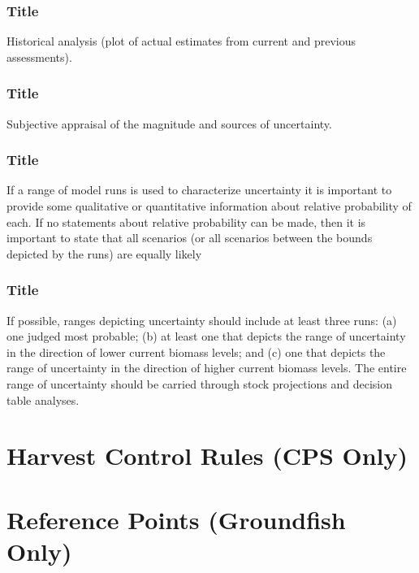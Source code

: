 \documentclass[12pt,]{article}
\begin{document}
\subsubsection{Title}\label{title-37}

Historical analysis (plot of actual estimates from current and previous
assessments).

\subsubsection{Title}\label{title-38}

Subjective appraisal of the magnitude and sources of uncertainty.

\subsubsection{Title}\label{title-39}

If a range of model runs is used to characterize uncertainty it is
important to provide some qualitative or quantitative information about
relative probability of each. If no statements about relative
probability can be made, then it is important to state that all
scenarios (or all scenarios between the bounds depicted by the runs) are
equally likely

\subsubsection{Title}\label{title-40}

\label{sec:uncertaintylast} If possible, ranges depicting uncertainty
should include at least three runs: (a) one judged most probable; (b) at
least one that depicts the range of uncertainty in the direction of
lower current biomass levels; and (c) one that depicts the range of
uncertainty in the direction of higher current biomass levels. The
entire range of uncertainty should be carried through stock projections
and decision table analyses.

\section{Harvest Control Rules (CPS
Only)}\label{harvest-control-rules-cps-only}

\section{Reference Points (Groundfish
Only)}\label{reference-points-groundfish-only}
\end{document}
